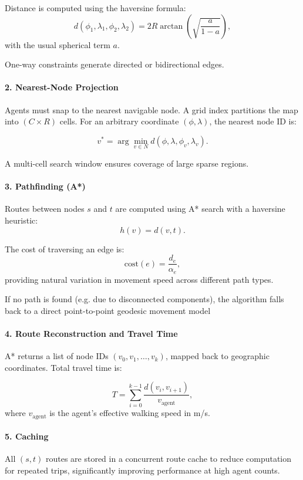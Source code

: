 Distance is computed using the haversine formula:
\[
d(\phi_1,\lambda_1,\phi_2,\lambda_2)
= 2R \arctan\!\left(
\sqrt{\frac{a}{1-a}}
\right),
\]
with the usual spherical term $a$.

One-way constraints generate directed or bidirectional edges.

\paragraph*{2. Nearest-Node Projection}

Agents must snap to the nearest navigable node. A grid index partitions the map into $(C \times R)$ cells. For an arbitrary coordinate $(\phi, \lambda)$, the nearest node ID is:

\[
v^* = \arg\min_{v \in N} d(\phi,\lambda, \phi_v,\lambda_v).
\]

A multi-cell search window ensures coverage of large sparse regions.

\paragraph*{3. Pathfinding (A*)}

Routes between nodes $s$ and $t$ are computed using A* search with a haversine heuristic:
\[
h(v) = d(v,t).
\]

The cost of traversing an edge is:
\[
\text{cost}(e) = \frac{d_e}{\alpha_e},
\]
providing natural variation in movement speed across different path types.

If no path is found (e.g. due to disconnected components), the algorithm falls back to a direct point-to-point geodesic movement model

\paragraph*{4. Route Reconstruction and Travel Time}

A* returns a list of node IDs $(v_0, v_1, \dots, v_k)$, mapped back to geographic coordinates. Total travel time is:

\[
T = \sum_{i=0}^{k-1} \frac{d(v_i, v_{i+1})}{v_\mathrm{agent}},
\]
where $v_\mathrm{agent}$ is the agent’s effective walking speed in m/s.

\paragraph*{5. Caching}

All $(s,t)$ routes are stored in a concurrent route cache to reduce computation for repeated trips, significantly improving performance at high agent counts.

